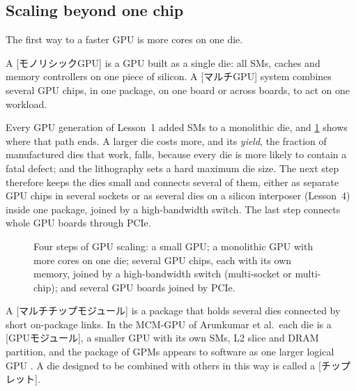 \documentclass[../main.tex]{subfiles}
\begin{document}
\subsection{Scaling beyond one chip}

The first way to a faster GPU is more cores on one die.

\begin{definition}
  A [モノリシックGPU] is a GPU built as a single
  die: all SMs, caches and memory controllers on one piece of
  silicon.
  A [マルチGPU] system combines several GPU chips, in one
  package, on one board or across boards, to act on one workload.
\end{definition}

Every GPU generation of Lesson~1 added SMs to a monolithic die, and
\cref{fig:l09-scaling} shows where that path ends.  A larger die costs
more, and its \emph{yield}, the fraction of manufactured dies that
work, falls, because every die is more likely to contain a fatal
defect; and the lithography sets a hard maximum die size.  The next step therefore keeps
the dies small and connects several of them, either as separate GPU
chips in several sockets or as several dies on a silicon interposer
(Lesson~4) inside one package, joined by a high-bandwidth switch.  The
last step connects whole GPU boards through PCIe.

\begin{figure}[tb]
  \centering
  
  \caption{Four steps of GPU scaling: a small GPU; a monolithic GPU with
    more cores on one die; several GPU chips, each with its own memory,
    joined by a high-bandwidth switch (multi-socket or multi-chip); and
    several GPU boards joined by PCIe.}
  \label{fig:l09-scaling}
\end{figure}

\begin{definition}
  A [マルチチップモジュール] is a package
  that holds several dies connected by short on-package links.  In the
  MCM-GPU of Arunkumar et al.\ each die is a
  [GPUモジュール], a smaller GPU with its own SMs,
  L2 slice and DRAM partition, and the package of GPMs appears to
  software as one larger logical GPU \cite{arunkumar2017mcmgpu}.  A die
  designed to be combined with others in this way is called a
  [チップレット].
\end{definition}
\end{document}
